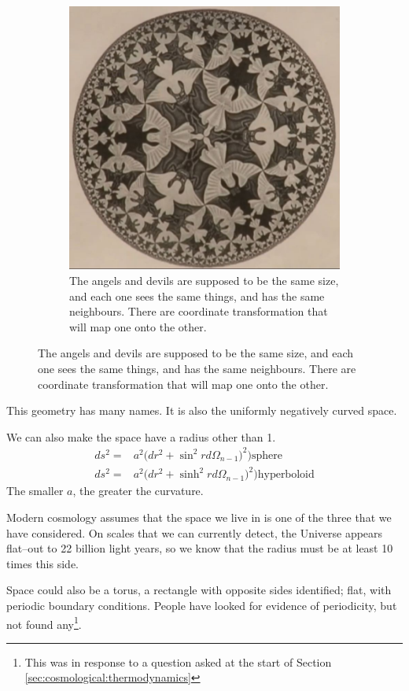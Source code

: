 \documentclass[]{article}
\begin{document}
\begin{figure}[H]
\begin{subfigure}[t]{0.3\textwidth}
	\end{subfigure}
	\;
	\begin{subfigure}[t]{0.3\textwidth}
		\caption{The angels and devils are supposed to be the same size, and each one sees the same things, and has the same neighbours. There are coordinate transformation that will map one onto the other.}
		\includegraphics[width=\textwidth]{cosmo3-escher}
	\end{subfigure}
\end{figure}

This geometry has many names. It is also the uniformly negatively curved space.

We can also make the space have a radius other than 1.
\begin{align*}
	ds^2 =& a^2 \big(dr^2 + \sin^2 r d\Omega_{n-1})^2\big) \text{sphere} \\
	ds^2 =& a^2 \big(dr^2 + \sinh^2 r d\Omega_{n-1})^2\big) \text{hyperboloid}
\end{align*}
The smaller $a$, the greater the curvature.

Modern cosmology assumes that the space we live in is one of the three that we have considered.  On scales that we can currently detect, the Universe appears flat--out to 22 billion light years, so we know that the radius must be at least 10 times this side.

Space could also be a torus, a rectangle with opposite sides identified; flat, with periodic boundary conditions. People have looked for evidence of periodicity, but not found any\footnote{This was in response to a question asked at the start of Section \ref{sec:cosmological:thermodynamics}}.
 
\end{document}
